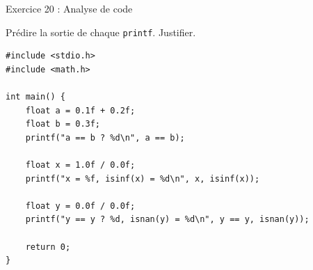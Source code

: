 \documentclass[10pt,a4paper]{article}
\begin{document}
\begin{exercicebox}{Exercice 20 : Analyse de code}

Prédire la sortie de chaque \texttt{printf}. Justifier.

\begin{lstlisting}
#include <stdio.h>
#include <math.h>

int main() {
    float a = 0.1f + 0.2f;
    float b = 0.3f;
    printf("a == b ? %d\n", a == b);
    
    float x = 1.0f / 0.0f;
    printf("x = %f, isinf(x) = %d\n", x, isinf(x));
    
    float y = 0.0f / 0.0f;
    printf("y == y ? %d, isnan(y) = %d\n", y == y, isnan(y));
    
    return 0;
}
\end{lstlisting}
\end{exercicebox}
\end{document}
